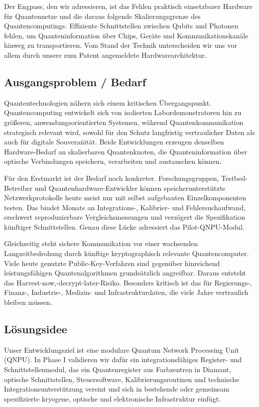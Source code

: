 \documentclass[11pt,oneside]{scrartcl}
\begin{document}
Der Engpass, den wir adressieren, ist das Fehlen praktisch einsetzbarer Hardware f\"ur Quantennetze und die daraus folgende Skalierungsgrenze des Quantencomputings. Effiziente Schnittstellen zwischen Qubits und Photonen fehlen, um Quanteninformation \"uber Chips, Ger\"ate und Kommunikationskan\"ale hinweg zu transportieren. Vom Stand der Technik unterscheiden wir uns vor allem durch unsere zum Patent angemeldete Hardwarearchitektur.

\subsection{Ausgangsproblem / Bedarf}
Quantentechnologien n\"ahern sich einem kritischen \"Ubergangspunkt. Quantencomputing entwickelt sich von isolierten Labordemonstratoren hin zu gr\"o\ss eren, anwendungsorientierten Systemen, w\"ahrend Quantenkommunikation strategisch relevant wird, sowohl f\"ur den Schutz langfristig vertraulicher Daten als auch f\"ur digitale Souvera\"nit\"at. Beide Entwicklungen erzeugen denselben Hardware-Bedarf an skalierbaren Quantenknoten, die Quanteninformation \"uber optische Verbindungen speichern, verarbeiten und austauschen k\"onnen.

F\"ur den Erstmarkt ist der Bedarf noch konkreter. Forschungsgruppen, Testbed-Betreiber und Quantenhardware-Entwickler k\"onnen speicherunterst\"utzte Netzwerkprotokolle heute meist nur mit selbst aufgebauten Einzelkomponenten testen. Das bindet Monate an Integrations-, Kalibrier- und Fehlersuchaufwand, erschwert reproduzierbare Vergleichsmessungen und verz\"ogert die Spezifikation k\"unftiger Schnittstellen. Genau diese L\"ucke adressiert das Pilot-QNPU-Modul.

Gleichzeitig steht sichere Kommunikation vor einer wachsenden Langzeitbedrohung durch k\"unftige kryptographisch relevante Quantencomputer. Viele heute genutzte Public-Key-Verfahren sind gegen\"uber hinreichend leistungsf\"ahigen Quantenalgorithmen grunds\"atzlich angreifbar. Daraus entsteht das Harvest-now,-decrypt-later-Risiko. Besonders kritisch ist das f\"ur Regierungs-, Finanz-, Industrie-, Medizin- und Infrastrukturdaten, die viele Jahre vertraulich bleiben m\"ussen.

\subsection{L\"osungsidee}
Unser Entwicklungsziel ist eine modulare Quantum Network Processing Unit (QNPU). In Phase I validieren wir daf\"ur ein integrationsf\"ahiges Register- und Schnittstellenmodul, das ein Quantenregister aus Farbzentren in Diamant, optische Schnittstellen, Steuersoftware, Kalibrierungsroutinen und technische Integrationsunterst\"utzung vereint und sich in bestehende oder gemeinsam spezifizierte kryogene, optische und elektronische Infrastruktur einf\"ugt.
\end{document}
